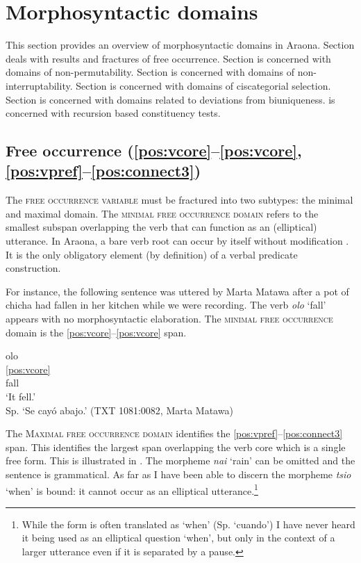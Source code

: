 \documentclass[output=paper,hidelinks]{langscibook}
\begin{document}
\section{Morphosyntactic domains}

\label{araona:sec:morphosyntacticdomains}

This section provides an overview of morphosyntactic domains in Araona.
Section  deals with results and fractures of free occurrence. Section  is concerned with domains of non-permutability. Section  is concerned with domains of non-interruptability. Section  is concerned with domains of ciscategorial selection. Section  is concerned with domains related to deviations from biuniqueness.  is concerned with recursion based constituency tests.

\subsection{Free occurrence (\ref{pos:vcore}--\ref{pos:vcore}, \ref{pos:vpref}--\ref{pos:connect3})}

\label{sec:freeoccurrence}

The \textsc{free occurrence variable} must be fractured into two subtypes: the minimal and maximal domain. The \textsc{minimal free occurrence domain} refers to the smallest subspan overlapping the verb that can function as an (elliptical) utterance. In Araona, a bare verb root can occur by itself without modification \citep{pitmanpitman1976}. It is the only obligatory element (by definition) of a verbal predicate construction.

For instance, the following sentence was uttered by Marta Matawa after a pot of chicha had fallen in her kitchen while we were recording. The verb \textit{olo} `fall' appears with no morphosyntactic elaboration. The \textsc{minimal free occurrence} domain is the \ref{pos:vcore}--\ref{pos:vcore} span.

\ea \label{ex:olo}
    \glll olo  \\
		\ref{pos:vcore} \\
		fall  \\
	\glt `It fell.' \\ Sp. `Se cayó abajo.' 
 \hfill (TXT 1081:0082, Marta Matawa)
\z

\hspace*{-3.5pt}The \textsc{Maximal free occurrence domain} identifies the \ref{pos:vpref}--\ref{pos:connect3} span. This identifies the largest span overlapping the verb core which is a single free form. This is illustrated in . The morpheme \textit{nai} `rain' can be omitted and the sentence is grammatical. As far as I have been able to discern the morpheme \textit{tsio} `when' is bound: it cannot occur as an elliptical utterance.\footnote{While the form is often translated as `when' (Sp. `cuando') I have never heard it being used as an elliptical question `when', but only in the context of a larger utterance even if it is separated by a pause.}
\end{document}
